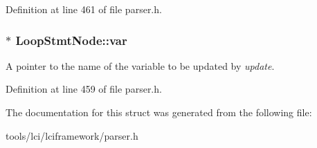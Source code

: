 Definition at line 461 of file parser.\-h.

\hypertarget{struct_loop_stmt_node_afb3820072966231fd1d43eea8ebd9234}{
\subsubsection[{var}]{$\ast$ {\bf Loop\-Stmt\-Node\-::var}}}\label{struct_loop_stmt_node_afb3820072966231fd1d43eea8ebd9234}
A pointer to the name of the variable to be updated by {\itshape update\/}. 

Definition at line 459 of file parser.\-h.



The documentation for this struct was generated from the following file\-:\begin{DoxyCompactItemize}
\item 
tools/lci/lciframework/parser.\-h\end{DoxyCompactItemize}
